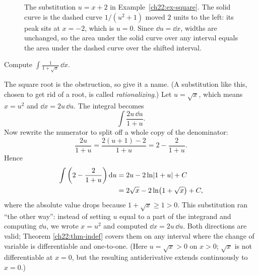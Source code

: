 \begin{figure}[htbp]
\centering
{}
\caption{The substitution $u = x+2$ in Example~\ref{ch22:ex-square}. The solid
curve is the dashed curve $1/(u^2+1)$ moved $2$ units to the left: its peak sits at
$x=-2$, which is $u=0$. Since $\dd u = \dd x$, widths are unchanged, so the area under
the solid curve over any interval equals the area under the dashed curve over the
shifted interval.}
\label{ch22:fig-shift}
\end{figure}

\begin{example}
\label{ch22:ex-rational}
Compute $\displaystyle \int \frac{1}{1+\sqrt{x}}\,\dd x$.

The square root is the obstruction, so give it a name. (A substitution like this,
chosen to get rid of a root, is called \emph{rationalizing}.) Let $u = \sqrt x$, which means
$x = u^2$ and $\dd x = 2u\,\dd u$. The integral becomes
\[
  \int \frac{2u\,\dd u}{1+u}.
\]
Now rewrite the numerator to split off a whole copy of the denominator:
\[
  \frac{2u}{1+u} = \frac{2(u+1) - 2}{1+u} = 2 - \frac{2}{1+u}.
\]
Hence
\begin{align*}
  \int\left(2 - \frac{2}{1+u}\right)\mathrm{d} u &= 2u - 2\ln\lvert1+u\rvert + C\\
   &= 2\sqrt x - 2\ln\!\big(1+\sqrt x\big) + C,
\end{align*}
where the absolute value drops because $1+\sqrt x \ge 1 > 0$. This
substitution ran ``the other way'': instead of setting $u$ equal to a part of the
integrand and computing $\dd u$, we wrote $x = u^2$ and computed $\dd x = 2u\,\dd u$.
Both directions are valid; Theorem \ref{ch22:thm-indef} covers them on any interval
where the change of variable is differentiable and one-to-one. (Here $u=\sqrt x > 0$
on $x > 0$; $\sqrt x$ is not differentiable at $x=0$, but the resulting antiderivative
extends continuously to $x=0$.)
\end{example}

